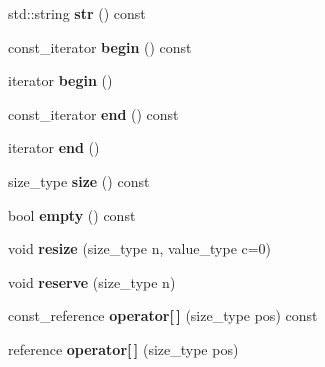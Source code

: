 \begin{DoxyCompactItemize}
\mbox{\label{class_c_data_stream_aac770a2b809917189c4476ee899b2d8b}} 
std\+::string {\bfseries str} () const
\item 
\mbox{\label{class_c_data_stream_a2355d11752d8622badfbc03e9ed192fd}} 
const\+\_\+iterator {\bfseries begin} () const
\item 
\mbox{\label{class_c_data_stream_a4b8ed86db3a4563fc327c903b0ccf4ee}} 
iterator {\bfseries begin} ()
\item 
\mbox{\label{class_c_data_stream_a66409dbd4403682fe674e2e71173cab4}} 
const\+\_\+iterator {\bfseries end} () const
\item 
\mbox{\label{class_c_data_stream_a6a486e8e0da9e769520de62b15bd9315}} 
iterator {\bfseries end} ()
\item 
\mbox{\label{class_c_data_stream_add30f866dd928fc28c47fe79a0a6723a}} 
size\+\_\+type {\bfseries size} () const
\item 
\mbox{\label{class_c_data_stream_ab2633ac67f098dad30d03291741c2e42}} 
bool {\bfseries empty} () const
\item 
\mbox{\label{class_c_data_stream_aa91abddde56127bd3d6ac2a0fb005874}} 
void {\bfseries resize} (size\+\_\+type n, value\+\_\+type c=0)
\item 
\mbox{\label{class_c_data_stream_a5542e71bd7af2ab7cd7be0f381d39cb5}} 
void {\bfseries reserve} (size\+\_\+type n)
\item 
\mbox{\label{class_c_data_stream_a7f242ea28a90db31d8f1b391cc6e3927}} 
const\+\_\+reference {\bfseries operator\mbox{[}$\,$\mbox{]}} (size\+\_\+type pos) const
\item 
\mbox{\label{class_c_data_stream_a91a057dd6e866137a7d526bd253fa8e9}} 
reference {\bfseries operator\mbox{[}$\,$\mbox{]}} (size\+\_\+type pos)
\item 
\mbox{\label{class_c_data_stream_ade6ed9a3a481e333900e6496707b9692}} 

\end{DoxyCompactItemize}
